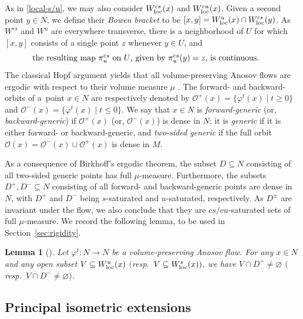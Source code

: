 \documentclass[10pt,a4paper]{amsart}
\numberwithin{equation}{section}
\newtheorem{Lemma}[Theorem]{Lemma}
\theoremstyle{definition}
\begin{document}
As in \eqref{local-s/u}, we may also consider $W^{cs}_{\rm loc}(x)$ and $W^{cu}_{\rm loc}(x)$. Given a second point $y\in N$, we define their \emph{Bowen bracket} to be $[x,y] = W^u_{\rm loc}(x) \cap W^{cs}_{\rm loc}(y)$. As $W^{cs}$ and $W^u$ are everywhere transverse, there is a neighborhood of $U$ for which $[x,y]$ consists of a single point $z$ whenever $y\in U$, and \begin{equation}\label{pi-cs-u}
\parbox{.85\textwidth}{the resulting map $\pi^{cs}_u$ on $U$, given by $\pi^{cs}_u(y)=z$, is continuous.}
\end{equation}
The classical Hopf argument yields that all volume-preserving Anosov flows are ergodic with respect to their volume measure $\mu$ \cite[Lemma A.1]{lefeuvre2023isometric}. The forward- and backward-orbits of a~point $x \in N$ are respectively denoted by $\mathcal{O}^+(x) = \bigl\{ \varphi^t(x) \mid t \geq 0\bigr\}$ and $\mathcal{O}^-(x)= \bigl\{\varphi^t(x) \mid t \leq 0\bigr\}$.
We say that $x \in N$ is \emph{forward-generic} (or, \emph{backward-generic}) if $\mathcal{O}^+(x)$ (or, $\mathcal{O}^-(x)$) is dense in $N$; it is \emph{generic} if it is either forward- or backward-generic, and \emph{two-sided generic} if the full orbit $\mathcal{O}(x) = \mathcal{O}^-(x) \cup \mathcal{O}^+(x)$ is dense in $M$.

As a consequence of Birkhoff's ergodic theorem, the subset $D\subseteq N$ consisting of all two-sided generic points has full $\mu$-measure. Furthermore, the subsets $D^+, D^-\subseteq N$ consisting of all forward- and backward-generic points are dense in $N$, with $D^+$ and $D^-$ being $s$-saturated and $u$-saturated, respectively. As $D^\pm$ are invariant under the flow, we also conclude that they are $cs/cu$-saturated sets of full $\mu$-measure. We record the following lemma, to be used in Section~\ref{sec:rigidity}.

\begin{Lemma}[{\cite[Corollary 2.1.6]{filip2024finiteness}}] \label{lem:cor-2-1-6}
 Let $\varphi^t \colon N \rightarrow N$ be a volume-preserving Anosov flow. For any $x \in N$ and any open subset $V \subseteq W^u_{\rm loc}(x)$ $($resp.\ $V \subseteq W^s_{\rm loc}(x))$, we have $V \cap D^+\neq \varnothing$ $($resp.\ $V \cap D^- \neq \varnothing)$.
\end{Lemma}

\subsection{Principal isometric extensions}
\end{document}
